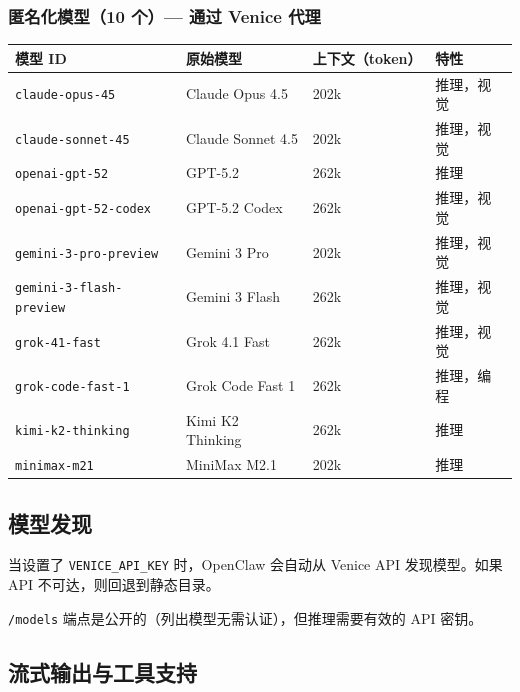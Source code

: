 \subsubsection{匿名化模型（10 个）— 通过 Venice 代理}



\begin{table}[h]
\centering
\small
\begin{tabular}{|l|l|l|l|}
\hline
模型 ID & 原始模型 & 上下文（token） & 特性 \\
\hline
\texttt{claude-opus-45} & Claude Opus 4.5 & 202k & 推理，视觉 \\
\hline
\texttt{claude-sonnet-45} & Claude Sonnet 4.5 & 202k & 推理，视觉 \\
\hline
\texttt{openai-gpt-52} & GPT-5.2 & 262k & 推理 \\
\hline
\texttt{openai-gpt-52-codex} & GPT-5.2 Codex & 262k & 推理，视觉 \\
\hline
\texttt{gemini-3-pro-preview} & Gemini 3 Pro & 202k & 推理，视觉 \\
\hline
\texttt{gemini-3-flash-preview} & Gemini 3 Flash & 262k & 推理，视觉 \\
\hline
\texttt{grok-41-fast} & Grok 4.1 Fast & 262k & 推理，视觉 \\
\hline
\texttt{grok-code-fast-1} & Grok Code Fast 1 & 262k & 推理，编程 \\
\hline
\texttt{kimi-k2-thinking} & Kimi K2 Thinking & 262k & 推理 \\
\hline
\texttt{minimax-m21} & MiniMax M2.1 & 202k & 推理 \\
\hline
\end{tabular}
\end{table}



\subsection{模型发现}


当设置了 \texttt{VENICE\_API\_KEY} 时，OpenClaw 会自动从 Venice API 发现模型。如果 API 不可达，则回退到静态目录。

\texttt{/models} 端点是公开的（列出模型无需认证），但推理需要有效的 API 密钥。

\subsection{流式输出与工具支持}



